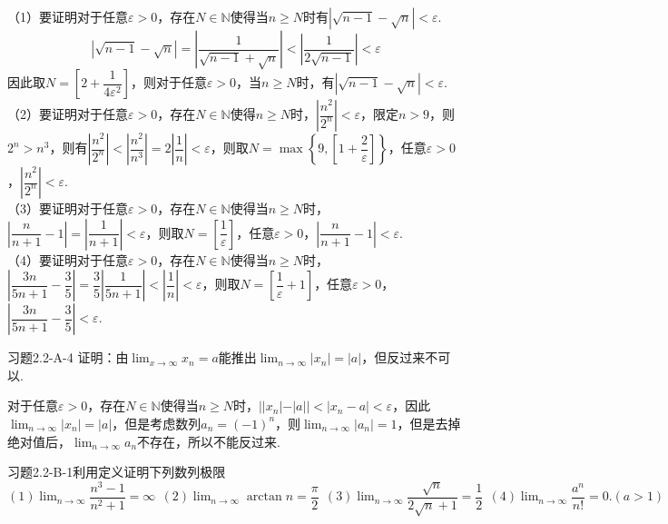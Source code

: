 \begin{solution}
（1）要证明对于任意$\varepsilon>0$，存在$N\in\mathbb{N}$使得当$n\geq N$时有$|\sqrt{n-1}-\sqrt{n}|<\varepsilon$.
\[|\sqrt{n-1}-\sqrt{n}|=\left|\dfrac{1}{\sqrt{n-1}+\sqrt{n}}\right|<\left|\dfrac{1}{2\sqrt{n-1}}\right|<\varepsilon\]
因此取$N=\left[2+\dfrac{1}{4\varepsilon^2}\right]$，则对于任意$\varepsilon>0$，当$n\geq N$时，有$\left|\sqrt{n-1}-\sqrt{n}\right|<\varepsilon$.\\
    （2）要证明对于任意$\varepsilon>0$，存在$N\in\mathbb{N}$使得$n\geq N$时，$\left|\dfrac{n^2}{2^n}\right|<\varepsilon$，限定$n>9$，则$2^n>n^3$，则有$\left|\dfrac{n^2}{2^n}\right|<\left|\dfrac{n^2}{n^3}\right|=2\left|\dfrac{1}{n}\right|<\varepsilon$，则取$N=\max\left\{9,\left[1+\dfrac{2}{\varepsilon}\right]\right\}$，任意$\varepsilon>0$，$\left|\dfrac{n^2}{2^n}\right|<\varepsilon$.\\
    （3）要证明对于任意$\varepsilon>0$，存在$N\in\mathbb{N}$使得当$n\geq N$时，$\left|\dfrac{n}{n+1}-1\right|=\left|\dfrac{1}{n+1}\right|<\varepsilon$，则取$N=\left[\dfrac{1}{\varepsilon}\right]$，任意$\varepsilon>0$，$\left|\dfrac{n}{n+1}-1\right|<\varepsilon$.\\
    （4）要证明对于任意$\varepsilon>0$，存在$N\in\mathbb{N}$使得当$n\geq N$时，$\left|\dfrac{3n}{5n+1}-\dfrac{3}{5}\right|=\dfrac{3}{5}\left|\dfrac{1}{5n+1}\right|<\left|\dfrac{1}{n}\right|<\varepsilon$，则取$N=\left[\dfrac{1}{\varepsilon}+1\right]$，任意$\varepsilon>0$，$\left|\dfrac{3n}{5n+1}-\dfrac{3}{5}\right|<\varepsilon$.
\end{solution}
\begin{example}{习题2.2-A-4}{}
    证明：由$\displaystyle\lim_{x\to\infty}x_n=a$能推出$\displaystyle\lim_{n\to\infty}|x_n|=|a|$，但反过来不可以.
\end{example}
\begin{solution}
    对于任意$\varepsilon>0$，存在$N\in\mathbb{N}$使得当$n\geq N$时，$||x_n|-|a||<|x_n-a|<\varepsilon$，因此$\displaystyle\lim_{n\to\infty}|x_n|=|a|$，但是考虑数列$a_n=(-1)^n$，则$\displaystyle\lim_{n\to\infty}|a_n|=1$，但是去掉绝对值后，$\displaystyle\lim_{n\to\infty}a_n$不存在，所以不能反过来.
\end{solution}
\begin{example}{习题2.2-B-1}{利用定义证明下列数列极限}
$(1)\displaystyle \lim_{n\to\infty}\dfrac{n^3-1}{n^2+1}=\infty~~(2)\lim_{n\to\infty}\arctan n=\dfrac{\pi}2~~(3)\displaystyle \lim_{n\to\infty}\dfrac{\sqrt{n}}{2\sqrt{n}+1}=\dfrac12~~(4)\lim_{n\to\infty}\dfrac{a^n}{n!}=0.(a>1)$
\end{example}
